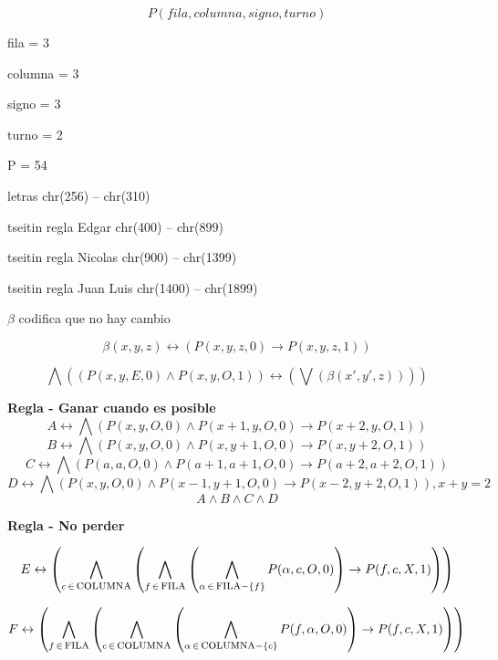 \documentclass{minimal}
\begin{document}
\[
P(fila, columna, signo, turno)
\]


fila = 3

columna = 3

signo = 3

turno = 2

P = 54

letras chr(256) -- chr(310)

tseitin regla Edgar chr(400) -- chr(899)

tseitin regla Nicolas chr(900) -- chr(1399)

tseitin regla Juan Luis chr(1400) -- chr(1899)


$\beta$ codifica que no hay cambio


\[
\beta(x,y,z) \leftrightarrow ( P(x,y,z,0) \to P(x,y,z,1)  )
\]

\[
\bigwedge\left(   ( P(x,y,E,0) \wedge P(x,y,O,1)  ) \leftrightarrow (\bigvee( \beta(x',y',z)  ) )    \right)
\]

\textbf{Regla - Ganar cuando es posible}
\[A \leftrightarrow \bigwedge\left(P(x,y,O,0)\wedge P(x+1,y,O,0) \rightarrow P(x+2,y,O,1)\right)\]
\[B \leftrightarrow \bigwedge\left(P(x,y,O,0)\wedge P(x,y+1,O,0) \rightarrow P(x,y+2,O,1)\right)\]
\[C \leftrightarrow \bigwedge\left(P(a,a,O,0)\wedge P(a+1,a+1,O,0) \rightarrow P(a+2,a+2,O,1)\right)\]
\[D \leftrightarrow \bigwedge\left(P(x,y,O,0)\wedge P(x-1,y+1,O,0) \rightarrow P(x-2,y+2,O,1)\right), x+y=2\]
\[A\wedge B\wedge C\wedge D\]


\textbf{Regla - No perder}


$$E \leftrightarrow  \left(\bigwedge_{c\,{\in}\,\mbox{\textsc{columna}}} \left( \bigwedge_{f\,{\in}\,\mbox{\textsc{fila}}} \left(\bigwedge_{\alpha \,{\in}\,\mbox{\textsc{fila}}- \{f\}} P(\alpha,c,O,0) \right) \rightarrow P(f,c,X,1)\right)\right) $$

$$F \leftrightarrow  \left(\bigwedge_{f\,{\in}\,\mbox{\textsc{fila}}} \left( \bigwedge_{c\,{\in}\,\mbox{\textsc{columna}}} \left(\bigwedge_{\alpha \,{\in}\,\mbox{\textsc{columna}}- \{c\}} P(f,\alpha,O,0) \right) \rightarrow P(f,c,X,1)\right)\right) $$

\end{document}

